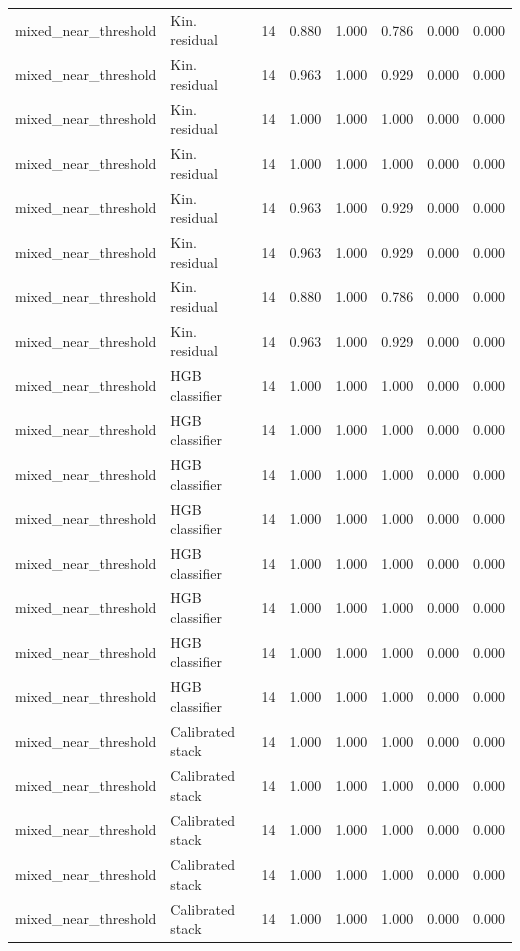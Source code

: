 {\begin{longtable}{llrrrrrr}
mixed\_near\_threshold & Kin. residual & 14 & 0.880 & 1.000 & 0.786 & 0.000 & 0.000 \\
mixed\_near\_threshold & Kin. residual & 14 & 0.963 & 1.000 & 0.929 & 0.000 & 0.000 \\
mixed\_near\_threshold & Kin. residual & 14 & 1.000 & 1.000 & 1.000 & 0.000 & 0.000 \\
mixed\_near\_threshold & Kin. residual & 14 & 1.000 & 1.000 & 1.000 & 0.000 & 0.000 \\
mixed\_near\_threshold & Kin. residual & 14 & 0.963 & 1.000 & 0.929 & 0.000 & 0.000 \\
mixed\_near\_threshold & Kin. residual & 14 & 0.963 & 1.000 & 0.929 & 0.000 & 0.000 \\
mixed\_near\_threshold & Kin. residual & 14 & 0.880 & 1.000 & 0.786 & 0.000 & 0.000 \\
mixed\_near\_threshold & Kin. residual & 14 & 0.963 & 1.000 & 0.929 & 0.000 & 0.000 \\
mixed\_near\_threshold & HGB classifier & 14 & 1.000 & 1.000 & 1.000 & 0.000 & 0.000 \\
mixed\_near\_threshold & HGB classifier & 14 & 1.000 & 1.000 & 1.000 & 0.000 & 0.000 \\
mixed\_near\_threshold & HGB classifier & 14 & 1.000 & 1.000 & 1.000 & 0.000 & 0.000 \\
mixed\_near\_threshold & HGB classifier & 14 & 1.000 & 1.000 & 1.000 & 0.000 & 0.000 \\
mixed\_near\_threshold & HGB classifier & 14 & 1.000 & 1.000 & 1.000 & 0.000 & 0.000 \\
mixed\_near\_threshold & HGB classifier & 14 & 1.000 & 1.000 & 1.000 & 0.000 & 0.000 \\
mixed\_near\_threshold & HGB classifier & 14 & 1.000 & 1.000 & 1.000 & 0.000 & 0.000 \\
mixed\_near\_threshold & HGB classifier & 14 & 1.000 & 1.000 & 1.000 & 0.000 & 0.000 \\
mixed\_near\_threshold & Calibrated stack & 14 & 1.000 & 1.000 & 1.000 & 0.000 & 0.000 \\
mixed\_near\_threshold & Calibrated stack & 14 & 1.000 & 1.000 & 1.000 & 0.000 & 0.000 \\
mixed\_near\_threshold & Calibrated stack & 14 & 1.000 & 1.000 & 1.000 & 0.000 & 0.000 \\
mixed\_near\_threshold & Calibrated stack & 14 & 1.000 & 1.000 & 1.000 & 0.000 & 0.000 \\
mixed\_near\_threshold & Calibrated stack & 14 & 1.000 & 1.000 & 1.000 & 0.000 & 0.000 \\

\end{longtable}}
